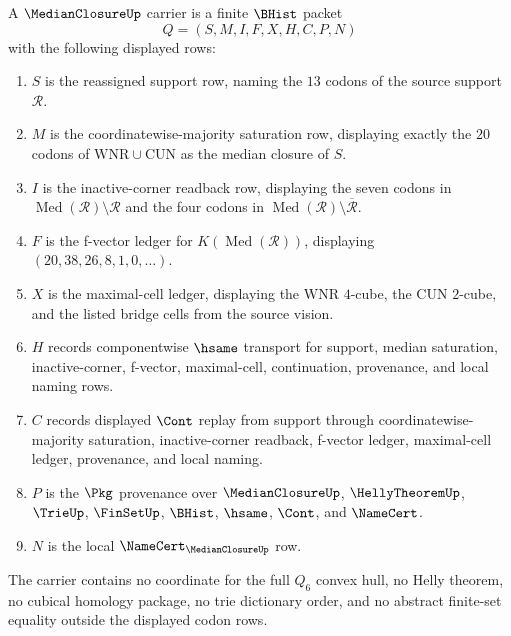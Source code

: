 \begin{definition}
\label{def:median-closure-carrier}
A $\MedianClosureUp$ carrier is a finite $\BHist$ packet
$$
Q=(S,M,I,F,X,H,C,P,N)
$$
with the following displayed rows:
\begin{enumerate}
\item $S$ is the reassigned support row, naming the $13$ codons of the source support $\mathcal{R}$.
\item $M$ is the coordinatewise-majority saturation row, displaying exactly the $20$ codons of $\mathrm{WNR}\cup\mathrm{CUN}$ as the median closure of $S$.
\item $I$ is the inactive-corner readback row, displaying the seven codons in $\operatorname{Med}(\mathcal{R})\setminus\mathcal{R}$ and the four codons in $\operatorname{Med}(\mathcal{R})\setminus\overline{\mathcal{R}}$.
\item $F$ is the f-vector ledger for $K(\operatorname{Med}(\mathcal{R}))$, displaying $(20,38,26,8,1,0,\ldots)$.
\item $X$ is the maximal-cell ledger, displaying the $\mathrm{WNR}$ $4$-cube, the $\mathrm{CUN}$ $2$-cube, and the listed bridge cells from the source vision.
\item $H$ records componentwise $\hsame$ transport for support, median saturation, inactive-corner, f-vector, maximal-cell, continuation, provenance, and local naming rows.
\item $C$ records displayed $\Cont$ replay from support through coordinatewise-majority saturation, inactive-corner readback, f-vector ledger, maximal-cell ledger, provenance, and local naming.
\item $P$ is the $\Pkg$ provenance over $\MedianClosureUp$, $\HellyTheoremUp$, $\TrieUp$, $\FinSetUp$, $\BHist$, $\hsame$, $\Cont$, and $\NameCert$.
\item $N$ is the local $\NameCert_{\MedianClosureUp}$ row.
\end{enumerate}
The carrier contains no coordinate for the full $Q_{6}$ convex hull, no Helly theorem, no cubical homology package, no trie dictionary order, and no abstract finite-set equality outside the displayed codon rows.
\end{definition}

